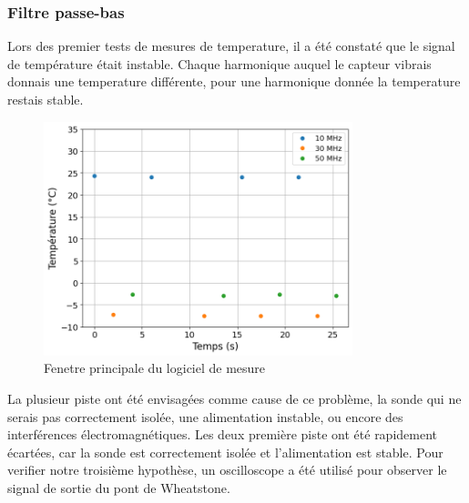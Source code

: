 \subsubsection{Filtre passe-bas}
Lors des premier tests de mesures de temperature, il a été constaté que le signal de température était instable.
Chaque harmonique auquel le capteur vibrais donnais une temperature différente, pour une harmonique donnée la temperature restais stable.
\begin{figure}[H]
    \centering
    \includegraphics[width=0.8\textwidth]{assets/figures/TempBruit.png}
    \caption{Fenetre principale du logiciel de mesure}
    \label{fig:TempBruit}
\end{figure}

La plusieur piste ont été envisagées comme cause de ce problème, la sonde qui ne serais pas correctement isolée, une alimentation instable, ou encore des interférences électromagnétiques.
Les deux première piste ont été rapidement écartées, car la sonde est correctement isolée et l'alimentation est stable.
Pour verifier notre troisième hypothèse, un oscilloscope a été utilisé pour observer le signal de sortie du pont de Wheatstone.

